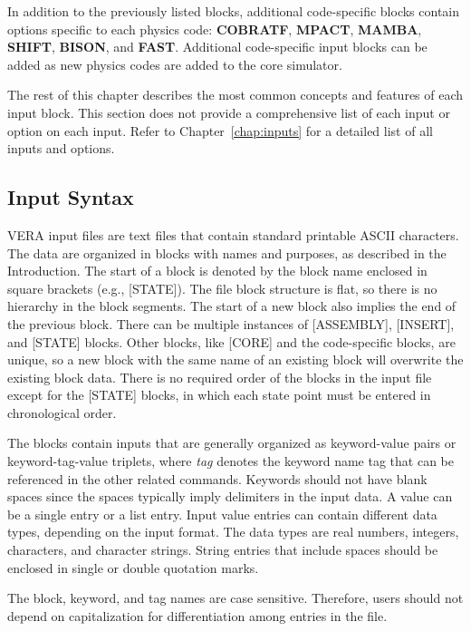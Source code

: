 \documentclass{vera-ornltm}
\begin{document}
In addition to the previously listed blocks, additional code-specific blocks contain
options specific to each physics code: {\bf COBRATF}, {\bf MPACT}, {\bf MAMBA}, {\bf SHIFT}, {\bf BISON}, and {\bf FAST}.
Additional code-specific input blocks can be added as new physics codes are added to the core simulator.

The rest of this chapter describes the most common concepts and features of each input block.
This section does not provide a comprehensive list of each input or option on each input.
Refer to Chapter~\ref{chap:inputs} for a detailed list of all inputs and options.

\subsection{Input Syntax}
\label{sec:inputsyntax}

VERA input files are text files that contain standard printable ASCII characters.
The data are organized in blocks with names and purposes, as described in the
Introduction. The start of a block is denoted by the block name enclosed in
square brackets (e.g., [STATE]). The file block structure is flat, so there is
no hierarchy in the block segments. The start of a new block also implies the end of
the previous block. There can be multiple instances of [ASSEMBLY], [INSERT], and [STATE] blocks.
Other blocks, like [CORE] and the code-specific blocks, are unique, so a new
block with the same name of an existing block will overwrite the existing block data.
There is no required order of the blocks in the input file except for the [STATE] blocks,
in which each state point must be entered in chronological order.

The blocks contain inputs that are generally organized as keyword-value pairs
or keyword-tag-value triplets, where \textit{tag} denotes the keyword name tag that can be
referenced in the other related commands. Keywords should not have blank spaces
since the spaces typically imply delimiters in the input data.  A value can be a single entry
or a list entry.
Input value entries can contain different data types, depending on the input format.
The data types are real numbers, integers, characters, and character strings.
String entries that include spaces should be enclosed in
single or double quotation marks.

The block, keyword, and tag names are case sensitive. Therefore, users should not depend on capitalization for differentiation among
entries in the file.
\end{document}
